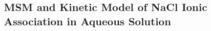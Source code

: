 \begin{spacing}{2.0}
    \subsection{MSM and Kinetic Model of NaCl Ionic Association in Aqueous Solution}

    \lipsum[1]
\end{spacing}
